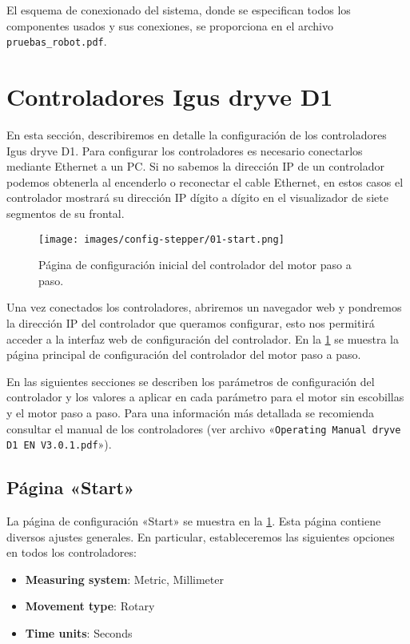 \documentclass[english,spanish,a4paper,11pt]{article}
\begin{document}
El esquema de conexionado del sistema, donde se especifican todos los componentes usados y sus conexiones, se proporciona en el archivo \texttt{pruebas\_robot.pdf}.


\section{Controladores Igus dryve D1}

En esta sección, describiremos en detalle la configuración de los controladores Igus dryve D1. Para configurar los controladores es necesario conectarlos mediante Ethernet a un PC. Si no sabemos la dirección IP de un controlador podemos obtenerla al encenderlo o reconectar el cable Ethernet, en estos casos el controlador mostrará su dirección IP dígito a dígito en el visualizador de siete segmentos de su frontal.

\begin{figure}[!ht]
    \centering
    \texttt{[image: images/config-stepper/01-start.png]}
    \caption{Página de configuración inicial del controlador del motor paso a paso.}
    \label{fig:conf_stepper_1}
\end{figure}

Una vez conectados los controladores, abriremos un navegador web y pondremos la dirección IP del controlador que queramos configurar, esto nos permitirá acceder a la interfaz web de configuración del controlador. En la \cref{fig:conf_stepper_1} se muestra la página principal de configuración del controlador del motor paso a paso.

En las siguientes secciones se describen los parámetros de configuración del controlador y los valores a aplicar en cada parámetro para el motor sin escobillas y el motor paso a paso. Para una información más detallada se recomienda consultar el manual de los controladores (ver archivo «\texttt{Operating Manual dryve D1 EN V3.0.1.pdf}»).

\subsection{Página «Start»}
\label{sec:conf_start}

La página de configuración «Start» se muestra en la \cref{fig:conf_stepper_1}. Esta página contiene diversos ajustes generales. En particular, estableceremos las siguientes opciones en todos los controladores:

\begin{itemize}
    \item \textbf{Measuring system}: Metric, Millimeter
    \item \textbf{Movement type}: Rotary
    \item \textbf{Time units}: Seconds
\end{itemize}
\end{document}
